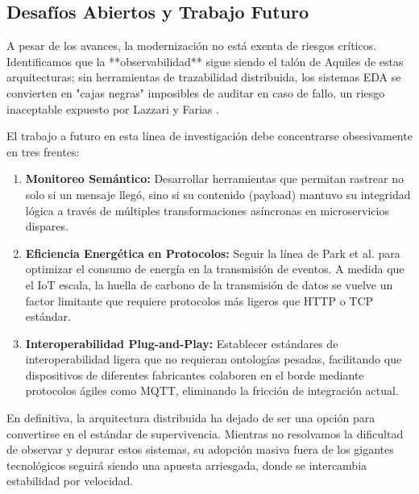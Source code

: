 \subsection{Desafíos Abiertos y Trabajo Futuro}
A pesar de los avances, la modernización no está exenta de riesgos críticos. Identificamos que la **observabilidad** sigue siendo el talón de Aquiles de estas arquitecturas; sin herramientas de trazabilidad distribuida, los sistemas EDA se convierten en "cajas negras" imposibles de auditar en caso de fallo, un riesgo inaceptable expuesto por Lazzari y Farias \cite{lazzari2023hidden}.

El trabajo a futuro en esta línea de investigación debe concentrarse obsesivamente en tres frentes:
\begin{enumerate}
    \item \textbf{Monitoreo Semántico:} Desarrollar herramientas que permitan rastrear no solo si un mensaje llegó, sino si su contenido (payload) mantuvo su integridad lógica a través de múltiples transformaciones asíncronas en microservicios dispares.
    \item \textbf{Eficiencia Energética en Protocolos:} Seguir la línea de Park et al. \cite{park2021cloud} para optimizar el consumo de energía en la transmisión de eventos. A medida que el IoT escala, la huella de carbono de la transmisión de datos se vuelve un factor limitante que requiere protocolos más ligeros que HTTP o TCP estándar.
    \item \textbf{Interoperabilidad Plug-and-Play:} Establecer estándares de interoperabilidad ligera que no requieran ontologías pesadas, facilitando que dispositivos de diferentes fabricantes colaboren en el borde mediante protocolos ágiles como MQTT, eliminando la fricción de integración actual.
\end{enumerate}

En definitiva, la arquitectura distribuida ha dejado de ser una opción para convertirse en el estándar de supervivencia. Mientras no resolvamos la dificultad de observar y depurar estos sistemas, su adopción masiva fuera de los gigantes tecnológicos seguirá siendo una apuesta arriesgada, donde se intercambia estabilidad por velocidad.